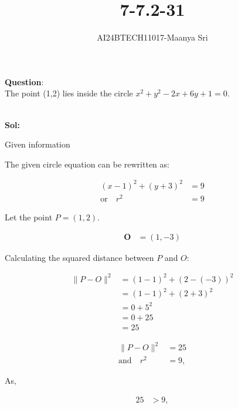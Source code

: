 \documentclass[journal]{IEEEtran}
\begin{document}

\vspace{3cm}

\title{7-7.2-31}
\author{AI24BTECH11017-Maanya Sri}
{\let\newpage\relax\maketitle}

\renewcommand{\thefigure}{\theenumi}
\renewcommand{\thetable}{\theenumi}
\setlength{\intextsep}{10pt} %


\textbf{Question}:\\
The point (1,2) lies inside the circle \(x^2 + y^2 - 2x + 6y + 1 = 0\).

\\ \textbf{Sol:}
\begin{table}[h!]
	\centering
	\caption{Given information}
	\label{tab7.2.31.1}
\end{table}

The given circle equation can be rewritten as:

\begin{align*}
(x - 1)^2 + (y + 3)^2 &= 9 \\
\text{or} \quad r^2 &= 9
\end{align*}

Let the point \( P = (1, 2) \).

\begin{align*}
\mathbf{O} &= (1, -3)
\end{align*}

Calculating the squared distance between \( P \) and \( O \):

\begin{align*}
\| P - O \|^2 &= (1 - 1)^2 + (2 - (-3))^2 \\
&= (1 - 1)^2 + (2 + 3)^2 \\
&= 0 + 5^2 \\
&= 0 + 25 \\
&= 25
\end{align*}



\begin{align*}
\| P - O \|^2 &= 25 \\
\text{and} \quad r^2 &= 9,
\end{align*}

As,

\begin{align*}
25 &> 9,
\end{align*}
\end{document}
